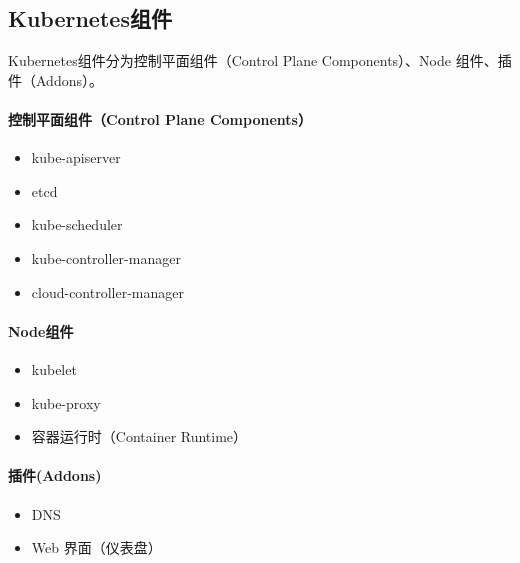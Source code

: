\documentclass[../../../interview-questions.tex]{subfiles}
\begin{document}
\subsection{Kubernetes组件}

Kubernetes组件分为控制平面组件（Control Plane Components）、Node 组件、插件（Addons）。

\paragraph{控制平面组件（Control Plane Components） }

\begin{itemize}
    \item {kube-apiserver}
    \item {etcd}
    \item {kube-scheduler}
    \item {kube-controller-manager}
    \item {cloud-controller-manager}
\end{itemize}


\paragraph{Node组件}

\begin{itemize}
    \item {kubelet}
    \item {kube-proxy}
    \item {容器运行时（Container Runtime）}
\end{itemize}


\paragraph{插件(Addons)}

\begin{itemize}
    \item {DNS}
    \item {Web 界面（仪表盘）}
\end{itemize}
\end{document}

